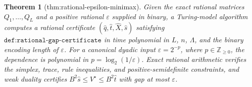 \documentclass{article}
\newtheorem{theorem}{Theorem}
\begin{document}
\begin{theorem}[thm:rational-epsilon-minimax]\label{thm:rational-epsilon-minimax}
Given the exact rational matrices \(Q_1,\ldots,Q_L\) and a positive rational \(\varepsilon\) supplied in binary, a Turing-model algorithm computes a rational certificate \((\widehat q,\widehat t,\widehat X,\widehat s)\) satisfying \(\texttt{def:rational-gap-certificate}\) in time polynomial in \(L\), \(n\), \(\Lambda\), and the binary encoding length of \(\varepsilon\). For a canonical dyadic input \(\varepsilon=2^{-p}\), where \(p\in\mathbb Z_{\ge0}\), the dependence is polynomial in \(p=\log_2(1/\varepsilon)\). Exact rational arithmetic verifies the simplex, trace, rule inequalities, and positive-semidefinite constraints, and weak duality certifies \(B^2\widehat s\le V^\star\le B^2\widehat t\) with gap at most \(\varepsilon\).
\end{theorem}
\end{document}

